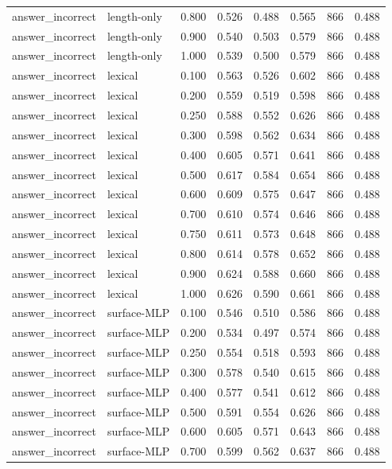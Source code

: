 \begin{tabular}{llrrrrrr}
answer_incorrect & length-only & 0.800 & 0.526 & 0.488 & 0.565 & 866 & 0.488 \\
answer_incorrect & length-only & 0.900 & 0.540 & 0.503 & 0.579 & 866 & 0.488 \\
answer_incorrect & length-only & 1.000 & 0.539 & 0.500 & 0.579 & 866 & 0.488 \\
answer_incorrect & lexical & 0.100 & 0.563 & 0.526 & 0.602 & 866 & 0.488 \\
answer_incorrect & lexical & 0.200 & 0.559 & 0.519 & 0.598 & 866 & 0.488 \\
answer_incorrect & lexical & 0.250 & 0.588 & 0.552 & 0.626 & 866 & 0.488 \\
answer_incorrect & lexical & 0.300 & 0.598 & 0.562 & 0.634 & 866 & 0.488 \\
answer_incorrect & lexical & 0.400 & 0.605 & 0.571 & 0.641 & 866 & 0.488 \\
answer_incorrect & lexical & 0.500 & 0.617 & 0.584 & 0.654 & 866 & 0.488 \\
answer_incorrect & lexical & 0.600 & 0.609 & 0.575 & 0.647 & 866 & 0.488 \\
answer_incorrect & lexical & 0.700 & 0.610 & 0.574 & 0.646 & 866 & 0.488 \\
answer_incorrect & lexical & 0.750 & 0.611 & 0.573 & 0.648 & 866 & 0.488 \\
answer_incorrect & lexical & 0.800 & 0.614 & 0.578 & 0.652 & 866 & 0.488 \\
answer_incorrect & lexical & 0.900 & 0.624 & 0.588 & 0.660 & 866 & 0.488 \\
answer_incorrect & lexical & 1.000 & 0.626 & 0.590 & 0.661 & 866 & 0.488 \\
answer_incorrect & surface-MLP & 0.100 & 0.546 & 0.510 & 0.586 & 866 & 0.488 \\
answer_incorrect & surface-MLP & 0.200 & 0.534 & 0.497 & 0.574 & 866 & 0.488 \\
answer_incorrect & surface-MLP & 0.250 & 0.554 & 0.518 & 0.593 & 866 & 0.488 \\
answer_incorrect & surface-MLP & 0.300 & 0.578 & 0.540 & 0.615 & 866 & 0.488 \\
answer_incorrect & surface-MLP & 0.400 & 0.577 & 0.541 & 0.612 & 866 & 0.488 \\
answer_incorrect & surface-MLP & 0.500 & 0.591 & 0.554 & 0.626 & 866 & 0.488 \\
answer_incorrect & surface-MLP & 0.600 & 0.605 & 0.571 & 0.643 & 866 & 0.488 \\
answer_incorrect & surface-MLP & 0.700 & 0.599 & 0.562 & 0.637 & 866 & 0.488 \\

\end{tabular}
